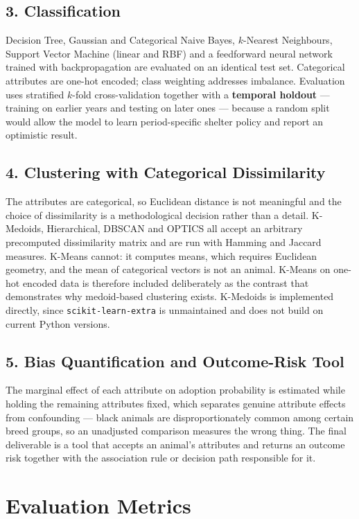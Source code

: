 \documentclass[11pt,a4paper]{article}
\begin{document}
\subsection*{3. Classification}
Decision Tree, Gaussian and Categorical Naive Bayes, $k$-Nearest Neighbours, Support
Vector Machine (linear and RBF) and a feedforward neural network trained with
backpropagation are evaluated on an identical test set. Categorical attributes are
one-hot encoded; class weighting addresses imbalance. Evaluation uses stratified
$k$-fold cross-validation together with a \textbf{temporal holdout} --- training on
earlier years and testing on later ones --- because a random split would allow the
model to learn period-specific shelter policy and report an optimistic result.

\subsection*{4. Clustering with Categorical Dissimilarity}
The attributes are categorical, so Euclidean distance is not meaningful and the choice
of dissimilarity is a methodological decision rather than a detail. K-Medoids,
Hierarchical, DBSCAN and OPTICS all accept an arbitrary precomputed dissimilarity
matrix and are run with Hamming and Jaccard measures. K-Means cannot: it computes
means, which requires Euclidean geometry, and the mean of categorical vectors is not
an animal. K-Means on one-hot encoded data is therefore included deliberately as the
contrast that demonstrates why medoid-based clustering exists. K-Medoids is
implemented directly, since \texttt{scikit-learn-extra} is unmaintained and does not
build on current Python versions.

\subsection*{5. Bias Quantification and Outcome-Risk Tool}
The marginal effect of each attribute on adoption probability is estimated while
holding the remaining attributes fixed, which separates genuine attribute effects from
confounding --- black animals are disproportionately common among certain breed groups,
so an unadjusted comparison measures the wrong thing. The final deliverable is a tool
that accepts an animal's attributes and returns an outcome risk together with the
association rule or decision path responsible for it.

\section*{Evaluation Metrics}
\end{document}
